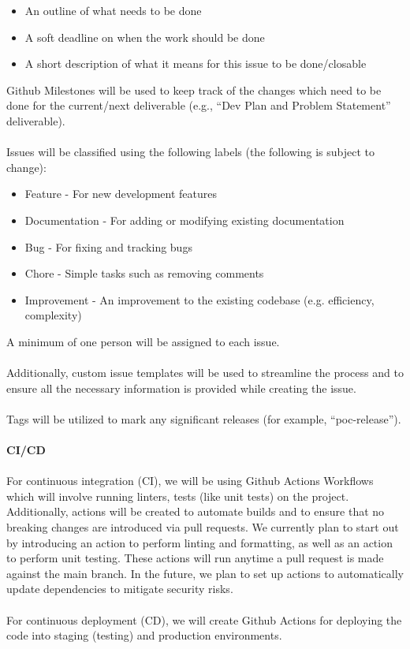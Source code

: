 \documentclass{article}
\begin{document}
\begin{itemize}
  \item An outline of what needs to be done
  \item A soft deadline on when the work should be done
  \item A short description of what it means for this issue to be done/closable
\end{itemize}
Github Milestones will be used to keep track of the changes which
need to be done for the current/next
deliverable (e.g., ``Dev Plan and Problem Statement'' deliverable).\\
\\
Issues will be classified using the following labels (the following
is subject to change):
\begin{itemize}
  \item Feature - For new development features
  \item Documentation - For adding or modifying existing documentation
  \item Bug - For fixing and tracking bugs
  \item Chore - Simple tasks such as removing comments
  \item Improvement - An improvement to the existing codebase (e.g.
    efficiency, complexity)
\end{itemize}
A minimum of one person will be assigned to each issue.\\
\\
Additionally, custom issue templates will be used to streamline the
process and to ensure all the necessary
information is provided while creating the issue.\\
\\
Tags will be utilized to mark any significant releases (for example,
“poc-release”).\\
\\
\textbf{CI/CD}\\
\\
For continuous integration (CI), we will be using Github Actions
Workflows which will involve running linters,
tests (like unit tests) on the project. Additionally, actions will be
created to automate builds and to ensure that
no breaking changes are introduced via pull requests. We currently
plan to start out by introducing an action
to perform linting and formatting, as well as an action to perform
unit testing. These actions will run anytime a
pull request is made against the main branch. In the future, we plan
to set up actions to automatically update
dependencies to mitigate security risks.\\
\\
For continuous deployment (CD), we will create Github Actions for
deploying the code into staging (testing)
and production environments.
\end{document}
